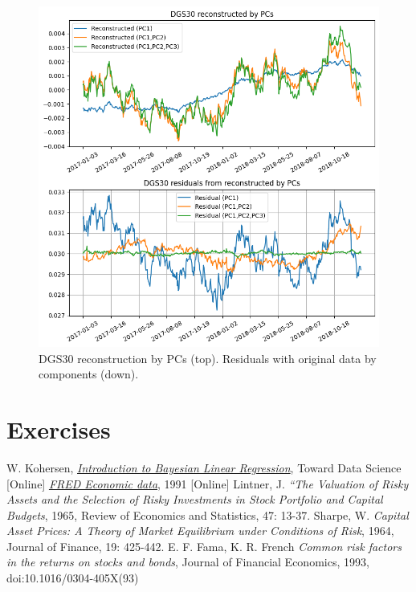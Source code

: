 \begin{figure}[hp]
	\centering
	\includegraphics[width=0.7\linewidth]{figures/dgs30_reco}
	\caption{DGS30 reconstruction by PCs (top). Residuals with original data by components (down).}
	\label{fig:pca_dsg30}
\end{figure}

\newpage
\section*{Exercises}


\begin{thebibliography}{9}
W. Kohersen, \href{https://towardsdatascience.com/introduction-to-bayesian-linear-regression-e66e60791ea7}{\emph{Introduction to Bayesian Linear Regression}}, Toward Data Science [Online]
\href{https://fred.stlouisfed.org/}{\emph{FRED Economic data}}, 1991 [Online]
 Lintner, J. \emph{“The Valuation of Risky Assets and the Selection of Risky Investments in Stock Portfolio and Capital Budgets}, 1965, Review of Economics and
Statistics, 47: 13-37.
 Sharpe, W. \emph{Capital Asset Prices: A Theory of Market Equilibrium under Conditions of Risk}, 1964, Journal of Finance, 19: 425-442.
 E. F. Fama, K. R. French \emph{Common risk factors in the returns on stocks and bonds}, Journal of Financial Economics, 1993, doi:10.1016/0304-405X(93)
\end{thebibliography}



